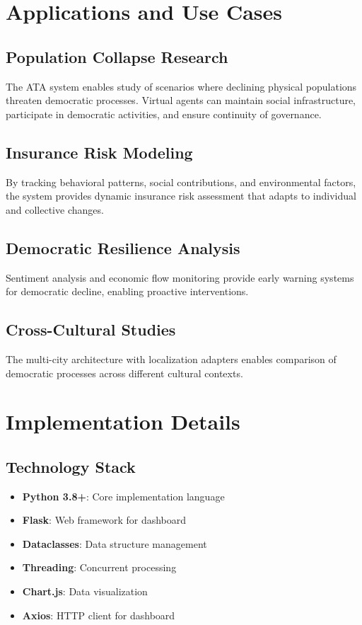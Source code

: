 \documentclass[12pt,a4paper]{article}
\begin{document}
\begin{itemize}
\section{Applications and Use Cases}

\subsection{Population Collapse Research}

The ATA system enables study of scenarios where declining physical populations threaten democratic processes. Virtual agents can maintain social infrastructure, participate in democratic activities, and ensure continuity of governance.

\subsection{Insurance Risk Modeling}

By tracking behavioral patterns, social contributions, and environmental factors, the system provides dynamic insurance risk assessment that adapts to individual and collective changes.

\subsection{Democratic Resilience Analysis}

Sentiment analysis and economic flow monitoring provide early warning systems for democratic decline, enabling proactive interventions.

\subsection{Cross-Cultural Studies}

The multi-city architecture with localization adapters enables comparison of democratic processes across different cultural contexts.

\section{Implementation Details}

\subsection{Technology Stack}

\begin{itemize}
    \item \textbf{Python 3.8+}: Core implementation language
    \item \textbf{Flask}: Web framework for dashboard
    \item \textbf{Dataclasses}: Data structure management
    \item \textbf{Threading}: Concurrent processing
    \item \textbf{Chart.js}: Data visualization
    \item \textbf{Axios}: HTTP client for dashboard
\end{itemize}


\end{itemize}
\end{document}
